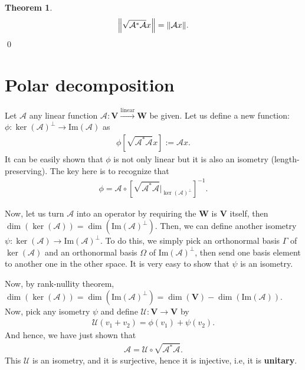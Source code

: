 \documentclass{book}
\theoremstyle{definition}
\newtheorem{thm}{Theorem}[section]
\newcommand{\Uni}{\mathcal{U}}
\newcommand{\V}{\mathbf{V}}
\newcommand{\W}{\mathbf{W}}
\newcommand{\A}{\mathcal{A}}
\newcommand{\ima}{\text{Im}}
\newcommand{\lin}{\overset{\text{linear}}{\longrightarrow}}
\newcommand{\lb}{\left[}
\newcommand{\rb}{\right]}
\begin{document}
\begin{thm}
	\begin{align*}
	\norm{\sqrt{\A^*\A} x} = \norm{\A x}.
	\end{align*}\qed
\end{thm}









\newpage 

\chapter{Polar decomposition}

Let $\A$ any linear function $\A : \V \lin \W$ be given. Let us define a new function:
$
\phi: \ker(\A)^\perp \to \ima(\A) 
$
as
\begin{align*}
\phi \lb \sqrt{\A^*\A} x\rb := \A x.
\end{align*}
It can be easily shown that $\phi$ is not only linear but it is also an isometry (length-preserving). The key here is to recognize that 
\begin{align*}
\phi = \A \circ \lb \sqrt{\A^*\A} \bigg\vert_{\ker(\A)^\perp} \rb^{-1}.
\end{align*}



Now, let us turn $\A$ into an operator by requiring the $\W$ is $\V$ itself, then $\dim(\ker(\A)) = \dim(\ima(\A)^\perp)$. Then, we can define another isometry $\psi: \ker(\A ) \to \ima(\A)^\perp$. To do this, we simply pick an orthonormal basis $\Gamma$ of $\ker(\A)$ and an orthonormal basis $\Omega$ of $\ima(\A)^\perp$, then send one basis element to another one in the other space. It is very easy to show that $\psi$ is an isometry. 


Now, by rank-nullity theorem, $\dim(\ker(\A)) = \dim(\ima(\A)^\perp) = \dim(\V)  - \dim(\ima(\A))$. Now, pick any isometry $\psi$ and define
$
\Uni : \V \to \V 
$
by 
\begin{align*}
\Uni(v_1 + v_2) = \phi(v_1) + \psi(v_2). 
\end{align*}
And hence, we have just shown that
\begin{align*}
\A = \Uni \circ \sqrt{\A^*\A}.
\end{align*}
This $\Uni$ is an isometry, and it is surjective, hence it is injective, i.e, it is \textbf{unitary}. 
\end{document}
